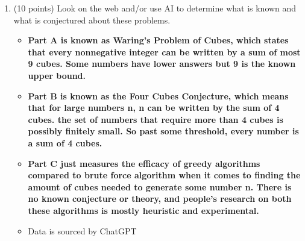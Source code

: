 \documentclass[12pt]{article}
\begin{document}
\begin{enumerate}
\begin{enumerate}
\begin{enumerate}
\begin{enumerate}
\item 
Every $n$ is the sum of $\le XXX$ cubes. 
Write your conjecture in quantifiers. 
\begin{itemize}
    \item {}
\end{itemize}
\item 
All but a finite number of $n$ is the sum of $\le XXX$ cubes. 
Write your conjecture in quantifiers.
\begin{itemize}
    \item {}
\end{itemize}
\item
For large $n$, the Greedy algorithm gives the same answer as brute force for approximately XXX fraction of $\{1,...,n\}$. 
(Note that brute force gives the {\it correct} answer so we are wondering how often Greedy gives the
correct answer.)
\begin{itemize}
    \item {}
    \item Assuming P(k) stands for "The greedy algorithm gives the same answer as brute force"
\end{itemize} 
\end{enumerate}
\end{enumerate}
\item
(10 points) 
Look on the web and/or use AI to determine what is known and what is conjectured
about these problems.
\begin{itemize}
    \item \textbf{Part A is known as Waring's Problem of Cubes, which states that every nonnegative integer can be written by a sum of most 9 cubes. Some numbers have lower answers but 9 is the known upper bound.} 
    \item \textbf{Part B is known as the Four Cubes Conjecture, which means that for large numbers n, n can be written by the sum of 4 cubes. the set of numbers that require more than 4 cubes is possibly finitely small. So past some threshold, every number is a sum of 4 cubes.}
    \item \textbf{Part C just measures the efficacy of greedy algorithms compared to brute force algorithm when it comes to finding the amount of cubes needed to generate some number n. There is no known conjecture or theory, and people's research on both these algorithms is mostly heuristic and experimental.}
    \item Data is sourced by ChatGPT
\end{itemize}
\end{enumerate}


\end{enumerate}
\end{document}
